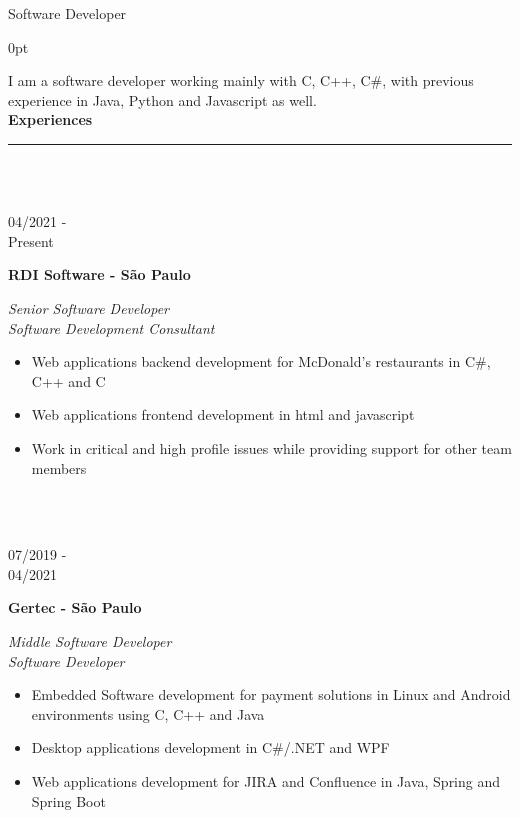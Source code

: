 \documentclass[a4paper]{article}
\begin{document}
	\LARGE Software Developer
	\vspace{12.5pt}
	\begin{adjustwidth}{\parindent}{0pt}
	\begin{minipage}[t]{0.65\textwidth}
	\large I am a software developer working mainly with C, C++, C\#, with previous experience in Java, Python and Javascript as well.\\

  \Large{\textbf{Experiences}} \normalsize \\ \rule{\textwidth}{0.5pt} \\ \\
  
  \begin{minipage}[t]{0.2\textwidth}
  	\large{04/2021 - \\ Present}
  \end{minipage}
  \begin{minipage}[t]{0.8\textwidth}
  	{
  		\setlength{\parskip}{5.5pt}
  		\Large{\textbf{RDI Software - São Paulo}}
  		
  		\large{\textit{Senior Software Developer}} \\
  		\large{\textit{Software Development Consultant}}
  		\begin{itemize}
  			\item \normalsize{Web applications backend development for McDonald's restaurants in C\#, C++ and C}
  			\item \normalsize{Web applications frontend development in html and javascript}
  			\item \normalsize{Work in critical and high profile issues while providing support for other team members}
  		\end{itemize}
  	}
  \end{minipage} \\ \\
  
  \begin{minipage}[t]{0.2\textwidth}
    \large{07/2019 - \\ 04/2021}
    \end{minipage}
    \begin{minipage}[t]{0.8\textwidth}
    {
      \setlength{\parskip}{5.5pt}
      \Large{\textbf{Gertec - São Paulo}}
    
      \large{\textit{Middle Software Developer}} \\
      \large{\textit{Software Developer}}
      
      \begin{itemize}
        \item \normalsize{Embedded Software development for payment solutions in Linux and Android environments using C, C++ and Java}
        \item \normalsize{Desktop applications development in C\#/.NET and WPF}
        \item \normalsize{Web applications development for JIRA and Confluence in Java, Spring and Spring Boot}
      \end{itemize}
    }
  \end{minipage} \\ \\


\end{minipage}
\end{adjustwidth}
\end{document}
